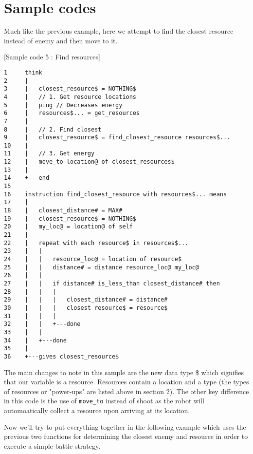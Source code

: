 \documentclass[a4paper]{article}
\begin{document}
\pagebreak

\section{Sample codes}

Much like the previous example, here we attempt to find the closest resource instead of enemy and then move to it.

[Sample code 5 : Find resources]
\begin{verbatim}
1     think
2     |
3     |   closest_resource$ = NOTHING$
4     |   // 1. Get resource locations
5     |   ping // Decreases energy
6     |   resources$... = get_resources
7     |
8     |   // 2. Find closest
9     |   closest_resource$ = find_closest_resource resources$...
10    |
11    |   // 3. Get energy
12    |   move_to location@ of closest_resources$  
13    |
14    +---end
15
16    instruction find_closest_resource with resources$... means
17    |
18    |   closest_distance# = MAX#
19    |   closest_resource$ = NOTHING$
20    |   my_loc@ = location@ of self
21    |
22    |   repeat with each resource$ in resources$...
23    |   |
24    |   |   resource_loc@ = location of resource$
25    |   |   distance# = distance resource_loc@ my_loc@
26    |   |
27    |   |   if distance# is_less_than closest_distance# then
28    |   |   |
29    |   |   |   closest_distance# = distance#
30    |   |   |   closest_resource$ = resource$
31    |   |   |
32    |   |   +---done
33    |   |
34    |   +---done
35    |
36    +---gives closest_resource$
\end{verbatim}

 
The main changes to note in this sample are the new data type \$ which signifies that our variable is a resource. Resources contain a location and a type (the types of resources or "power-ups" are listed above in section 2). The other key difference in this code is the use of \texttt{move\_to} instead of shoot as the robot will automoatically collect a resource upon arriving at its location.\\

\pagebreak

Now we'll try to put everything together in the following example which uses the previous two functions for determining the closest enemy and resource in order to execute a simple battle strategy.
\end{document}
